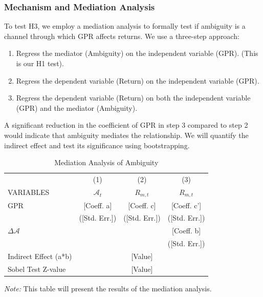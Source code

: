 \documentclass[preprint,12pt,authoryear]{elsarticle}
\begin{document}
\subsubsection{Mechanism and Mediation Analysis}
To test H3, we employ a mediation analysis to formally test if ambiguity is a channel through which GPR affects returns. We use a three-step approach:
\begin{enumerate}
    \item Regress the mediator (Ambiguity) on the independent variable (GPR). (This is our H1 test).
    \item Regress the dependent variable (Return) on the independent variable (GPR).
    \item Regress the dependent variable (Return) on both the independent variable (GPR) and the mediator (Ambiguity).
\end{enumerate}
A significant reduction in the coefficient of GPR in step 3 compared to step 2 would indicate that ambiguity mediates the relationship. We will quantify the indirect effect and test its significance using bootstrapping.

\begin{table}[H]
\centering
\caption{Mediation Analysis of Ambiguity}
\label{tab:mediation}
\begin{threeparttable}
\begin{tabular}{lccc}
\toprule
 & (1) & (2) & (3) \\
VARIABLES & $\mathcal{A}_t$ & $R_{m,t}$ & $R_{m,t}$ \\
\midrule
GPR & [Coeff. a] & [Coeff. c] & [Coeff. c'] \\
 & ([Std. Err.]) & ([Std. Err.]) & ([Std. Err.]) \\
$\Delta\mathcal{A}$ & & & [Coeff. b] \\
 & & & ([Std. Err.]) \\
\midrule
Indirect Effect (a*b) & \multicolumn{3}{c}{[Value]} \\
Sobel Test Z-value & \multicolumn{3}{c}{[Value]} \\
\bottomrule
\end{tabular}
\begin{tablenotes}
\item \textit{Note:} This table will present the results of the mediation analysis.
\end{tablenotes}
\end{threeparttable}
\end{table}
\end{document}
